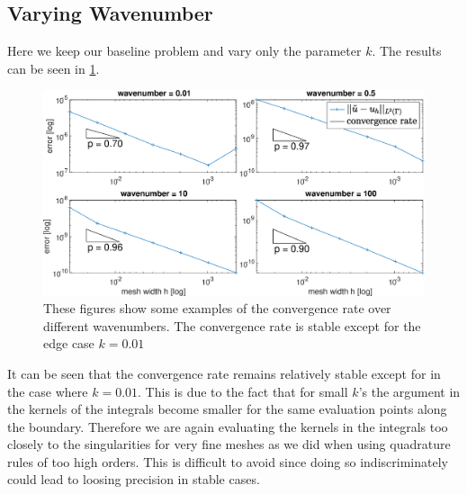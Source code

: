 \documentclass[a4paper, oneside]{thirdparty_stylesheets/discothesis}
\begin{document}
\subsection{Varying Wavenumber}
Here we keep our baseline problem and vary only the parameter $k$.
The results can be seen in \ref{fig:wavenumber}.
\begin{figure} [!ht]
	\centering
	\includegraphics[width=\columnwidth]{figures/wavenumber.eps}
	\caption{ These figures show some examples of the convergence rate over different wavenumbers.
	The convergence rate is stable except for the edge case $k=0.01$}
	\label{fig:wavenumber}
\end{figure}
It can be seen that the convergence rate remains relatively stable except for in the case where $k=0.01$.
This is due to the fact that for small $k$'s the argument in the kernels of the integrals become smaller for the same evaluation points along the boundary.
Therefore we are again evaluating the kernels in the integrals too closely to the singularities for very fine meshes as we did when using quadrature rules of too high orders.
This is difficult to avoid since doing so indiscriminately could lead to loosing precision in stable cases.
\end{document}
